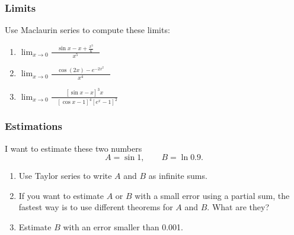 \begin{frame}[t]
	\frametitle{Limits}

	Use Maclaurin series to compute these limits:
	\vfill

	\begin{enumerate}
		\item \; $\displaystyle \lim_{x \to 0}\frac{\quad \sin x - x +
			\frac{x^{3}}{6} \quad }{x^{5}}$
			\vfill

		\item \; $\displaystyle \lim_{x \to 0}\frac{\quad \cos(2x) - e^{-2x^2}\quad }{x^{4}}$
			\vfill

		\item \; $\displaystyle \lim_{x \to 0}\frac{\left[ \sin x - x \right]^{3}x }{\quad
			\left[ \cos x - 1\right]^{4}\left[ e^{x}- 1 \right]^{2}}\quad$
			\vfill
	\end{enumerate}
\end{frame}

\begin{frame}[t]
	\frametitle{Estimations}

	I want to estimate these two numbers
	\[
		A = \sin 1, \quad \quad B = \ln 0.9.
	\]

	\begin{enumerate}
		\item Use Taylor series to write $A$ and $B$ as infinite sums.
			\vspace{.5cm}

		\item If you want to estimate $A$ or $B$ with a small error using a partial sum,
			the fastest way is to use different theorems for $A$ and $B$. What are they?
			\vspace{.5cm}

		\item Estimate $B$ with an error smaller than 0.001.
	\end{enumerate}
\end{frame}